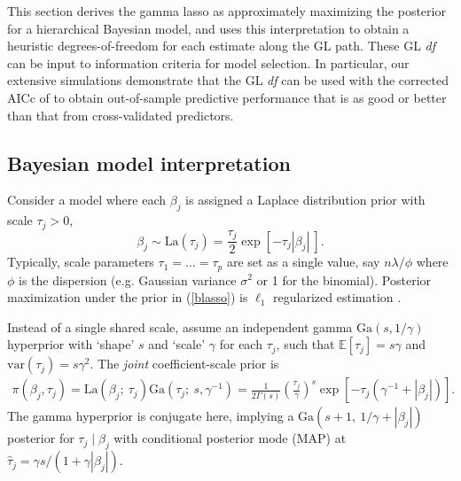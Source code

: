 \documentclass[12pt]{article}
\newcommand{\mr}[1]{\mathrm{#1}}
\newcommand{\ds}[1]{\mathds{#1}}
\begin{document}
This section derives the gamma lasso as approximately maximizing the posterior
for a hierarchical Bayesian model, and uses this
interpretation to obtain a heuristic degrees-of-freedom for each estimate
along the GL path.  These GL \textit{df} can  be input to information criteria
for model selection. In particular, our extensive simulations demonstrate that the GL
\textit{df} can be used with  the corrected AICc of
\citet{hurvich_regression_1989}  to obtain out-of-sample predictive
performance that is as good or better than that from cross-validated
predictors.


\subsection{Bayesian model interpretation}

Consider a model where each $\beta_j$ is
assigned a Laplace distribution prior with scale $\tau_j>0$,
\begin{equation}\label{blasso}
\beta_j \sim \mr{La}\left(\tau_j\right) =
\frac{\tau_j}{2}\exp\left[ -\tau_j|\beta_j| ~\right].
\end{equation}
Typically, scale parameters $\tau_1 =
\ldots = \tau_p$ are set as a single value, say $n\lambda/\phi$ where
 $\phi$ is the dispersion (e.g. Gaussian variance
$\sigma^2$ or 1 for the binomial).   Posterior
maximization under the prior in (\ref{blasso}) is $\ell_1$ regularized estimation \citep[e.g.,][]{park_bayesian_2008}.

Instead of a single shared scale, assume an independent gamma
$\mr{Ga}(s,1/\gamma)$ hyperprior with `shape' $s$ and `scale' $\gamma$ for
each $\tau_j$, such that $\ds{E}[\tau_j] = s\gamma$ and $\mr{var}(\tau_j) =
s\gamma^2$.  The {\it joint} coefficient-scale prior is
\begin{align}\label{glprior}
\pi(\beta_j,\tau_j) = \mr{La}\left(\beta_j ;~ \tau_j\right)
\mr{Ga}\left(\tau_j;~ s,\gamma^{-1}\right) = \frac{ 1}{2\Gamma({s})} 
\left(\frac{\tau_j}{\gamma}\right)^{s}
               \exp\left[-\tau_j(\gamma^{-1}+|\beta_j|)\right].
\end{align}
The gamma hyperprior is conjugate here, implying a $\mr{Ga}\left(s+1, ~1/\gamma +
|\beta_j|\right)$ posterior for $\tau_j \mid \beta_j$ with conditional
posterior mode (MAP) at $\hat\tau_j = \gamma s/(1 + \gamma |\beta_j|)$.
\end{document}
